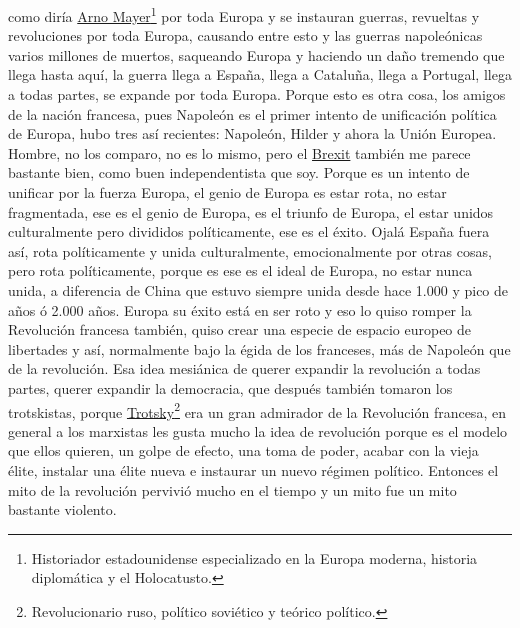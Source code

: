 como diría \href{https://en.wikipedia.org/wiki/Arno_J._Mayer}{Arno Mayer}\footnote{Historiador estadounidense especializado en la Europa moderna, historia diplomática y el Holocatusto.} por toda Europa y se instauran guerras, revueltas y revoluciones por toda Europa, causando entre esto y las guerras napoleónicas varios millones de muertos, saqueando Europa y haciendo un daño tremendo que llega hasta aquí, la guerra llega a España, llega a Cataluña, llega a Portugal, llega a todas partes, se expande por toda Europa. Porque esto es otra cosa, los amigos de la nación francesa, pues Napoleón es el primer intento de unificación política de Europa, hubo tres así recientes: Napoleón, Hilder y ahora la Unión Europea. Hombre, no los comparo, no es lo mismo, pero el \href{https://en.wikipedia.org/wiki/Brexit}{Brexit} también me parece bastante bien, como buen independentista que soy. Porque es un intento de unificar por la fuerza Europa, el genio de Europa es estar rota, no estar fragmentada, ese es el genio de Europa, es el triunfo de Europa, el estar unidos culturalmente pero divididos políticamente, ese es el éxito. Ojalá España fuera así, rota políticamente y unida culturalmente, emocionalmente por otras cosas, pero rota políticamente, porque es ese es el ideal de Europa, no estar nunca unida, a diferencia de China que estuvo siempre unida desde hace 1.000 y pico de años ó 2.000 años. Europa su éxito está en ser roto y eso lo quiso romper la Revolución francesa también, quiso crear una especie de espacio europeo de libertades y así, normalmente bajo la égida de los franceses, más de Napoleón que de la revolución. Esa idea mesiánica de querer expandir la revolución a todas partes, querer expandir la democracia, que después también tomaron los trotskistas, porque \href{https://en.wikipedia.org/wiki/Leon_Trotsky}{Trotsky}\footnote{Revolucionario ruso, político soviético y teórico político.} era un gran admirador de la Revolución francesa, en general a los marxistas les gusta mucho la idea de revolución porque es el modelo que ellos quieren, un golpe de efecto, una toma de poder, acabar con la vieja élite, instalar una élite nueva e instaurar un nuevo régimen político. Entonces el mito de la revolución pervivió mucho en el tiempo y un mito fue un mito bastante violento.

